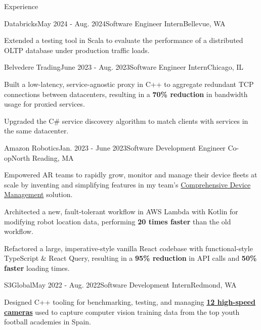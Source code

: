 \documentclass{resume}
\begin{document}
  \vspace{-5pt}
  \begin{rSection}{Experience}

    \begin{rSubsection}{Databricks}{May 2024 - Aug. 2024}{Software Engineer Intern}{Bellevue, WA}
      \item Extended a testing tool in Scala to evaluate the performance of a distributed
      OLTP database under production traffic loads.
    \end{rSubsection}

    \begin{rSubsection}{Belvedere Trading}{June 2023 - Aug. 2023}{Software Engineer Intern}{Chicago, IL}
      \item Built a low-latency, service-agnostic proxy in C++ to aggregate redundant TCP
        connections between datacenters, resulting in a \textbf{70\% reduction} in bandwidth usage for proxied services.
      \item Upgraded the C\# service discovery algorithm to match clients with services in the same datacenter.
    \end{rSubsection}

    \begin{rSubsection}{Amazon Robotics}{Jan. 2023 - June 2023}{Software Development Engineer Co-op}{North Reading, MA}
      \item Empowered AR teams to rapidly grow, monitor and manage their device fleets at scale by inventing and simplifying
        features in my team's 
        \href{https://www.allthingsdistributed.com/2021/07/amazon-robotics-on-aws.html}{Comprehensive Device Management} solution. 
      \item Architected a new, fault-tolerant workflow in AWS Lambda with Kotlin for modifying 
        robot location data, performing \textbf{20 times faster} than the old workflow.
      \item Refactored a large, imperative-style vanilla React codebase with functional-style 
        TypeScript \& React Query, resulting in a \textbf{95\% reduction} in API calls and \textbf{50\% faster} loading times.
    \end{rSubsection}

    \begin{rSubsection}{S3Global}{May 2022 - Aug. 2022}{Software Development Intern}{Redmond, WA}
    \item Designed C++ tooling for benchmarking, testing, and managing 
      \textbf{\href{https://emergentvisiontec.com/}{12 high-speed cameras}} used to capture 
        computer vision training data from the top youth football academies in Spain.
    \end{rSubsection}

  \end{rSection}
\end{document}

